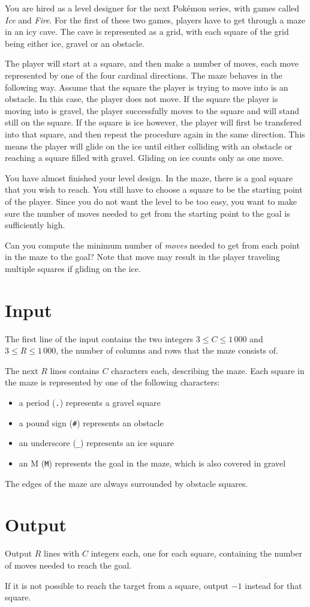 You are hired as a level designer for the next Pokémon series, with games called \emph{Ice} and \emph{Fire}.
For the first of these two games, players have to get through a maze in an icy cave.
The cave is represented as a grid, with each square of the grid being either ice, gravel or an obstacle.

The player will start at a square, and then make a number of moves, each move represented by one of the four cardinal directions.
The maze behaves in the following way.
Assume that the square the player is trying to move into is an obstacle.
In this case, the player does not move.
If the square the player is moving into is gravel, the player successfully moves to the square and will stand still on the square.
If the square is ice however, the player will first be transfered into that square, and then repeat the procedure again in the same direction.
This means the player will glide on the ice until either colliding with an obstacle or reaching a square filled with gravel.
Gliding on ice counts only as one move.

You have almost finished your level design.
In the maze, there is a goal square that you wish to reach.
You still have to choose a square to be the starting point of the player.
Since you do not want the level to be too easy, you want to make sure the number of moves needed to get from the starting point to the goal is sufficiently high.

Can you compute the minimum number of \emph{moves} needed to get from each point in the maze to the goal?
Note that move may result in the player traveling multiple squares if gliding on the ice.

\section*{Input}
The first line of the input contains the two integers $3 \le C \le 1\,000$ and $3 \le R \le 1\,000$, the number of columns and rows that the maze consists of.

The next $R$ lines contains $C$ characters each, describing the maze.
Each square in the maze is represented by one of the following characters:
\begin{itemize}
\item a period (\texttt{.}) represents a gravel square
\item a pound sign (\texttt{\#}) represents an obstacle
\item an underscore (\texttt{\_}) represents an ice square
\item an M (\texttt{M}) represents the goal in the maze, which is also covered in gravel
\end{itemize}

The edges of the maze are always surrounded by obstacle squares.

\section*{Output}
Output $R$ lines with $C$ integers each, one for each square, containing the number of moves needed to reach the goal.

If it is not possible to reach the target from a square, output $-1$ instead for that square.
